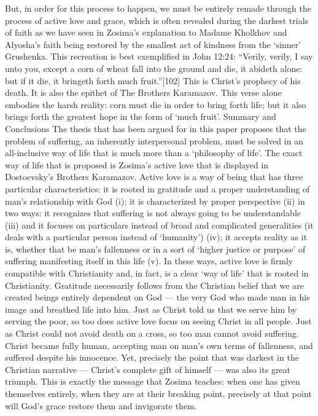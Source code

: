 But, in order for this process to happen, we must be entirely remade through the process of active love and grace, which is often revealed during the darkest trials of faith as we have seen in Zosima’s explanation to Madame Kholkhov and Alyosha’s faith being restored by the smallest act of kindness from the ‘sinner’ Grushenka. This recreation is best exemplified  in John 12:24: “Verily, verily, I say unto you, except a corn of wheat fall into the ground and die, it abideth alone: but if it die, it bringeth forth much fruit.”[102] This is Christ’s prophecy of his death. It is also the epithet of The Brothers Karamazov. This verse alone embodies the harsh reality: corn must die in order to bring forth life; but it also brings forth the greatest hope in the form of ‘much fruit’.
Summary and Conclusions
The thesis that has been argued for in this paper proposes that the problem of suffering, an inherently interpersonal problem, must be solved in an all-inclusive way of life that is much more than a ‘philosophy of life’. The exact way of life that is proposed is Zosima’s active love that is displayed in Dostoevsky’s Brothers Karamazov. Active love is a way of being that has three particular characteristics: it is rooted in gratitude and a proper understanding of man’s relationship with God (i); it is characterized by proper perspective (ii) in two ways: it recognizes that suffering is not always going to be understandable (iii) and it focuses on particulars instead of broad and complicated generalities (it deals with a particular person instead of ‘humanity’) (iv); it accepts reality as it is, whether that be man’s fallenness or in a sort of ‘higher justice or purpose’ of suffering manifesting itself in this life (v). In these ways, active love is firmly compatible with Christianity and, in fact, is a clear ‘way of life’ that is rooted in Christianity. 
Gratitude necessarily follows from the Christian belief that we are created beings entirely dependent on God — the very God who made man in his image and breathed life into him. Just as Christ told us that we serve him by serving the poor, so too does active love focus on seeing Christ in all people. Just as Christ could not avoid death on a cross, so too man cannot avoid suffering. Christ became fully human, accepting man on man’s own terms of fallenness, and suffered despite his innocence. Yet, precisely the point that was darkest in the Christian narrative — Christ’s complete gift of himself — was also its great triumph. This is exactly the message that Zosima teaches: when one has given themselves entirely, when they are at their breaking point, precisely at that point will God’s grace restore them and invigorate them.
